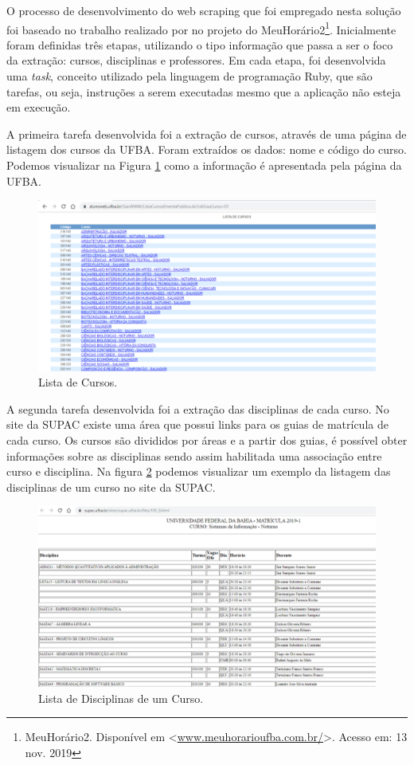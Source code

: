 \documentclass[12pt, a4paper]{report}
\begin{document}
O processo de desenvolvimento do web scraping que foi empregado nesta solução foi baseado no trabalho realizado por \citeauthor{assis2017meuhorario} no projeto do MeuHorário2\footnote{MeuHorário2. Disponível em <\url{www.meuhorarioufba.com.br/}>. Acesso em: 13 nov. 2019}. Inicialmente foram definidas três etapas, utilizando o tipo informação que passa a ser o foco da extração: cursos, disciplinas e professores.  Em cada etapa, foi desenvolvida uma \textit{task}, conceito utilizado pela linguagem de programação Ruby, que são tarefas, ou seja, instruções a serem executadas mesmo que a aplicação não esteja em execução. 

A primeira tarefa desenvolvida foi a extração de cursos, através de uma página de listagem dos cursos da UFBA. Foram extraídos os dados: nome e código do curso. Podemos visualizar na Figura \ref{fig:lista_cursos} como a informação é apresentada pela página da UFBA.

\begin{figure}
\centering
\includegraphics[scale=0.9]{lista_cursos.png}
\caption{Lista de Cursos.}
\label{fig:lista_cursos}
\end{figure}

A segunda tarefa desenvolvida foi a extração das disciplinas de cada curso. No site da \ac{SUPAC} existe uma área que possui links para os guias de matrícula de cada curso. Os cursos são divididos por áreas e a partir dos guias, é possível obter informações sobre as disciplinas sendo assim habilitada uma associação entre curso e disciplina. Na figura \ref{fig:disciplinas} podemos visualizar um exemplo da listagem das disciplinas de um curso no site da SUPAC.

\begin{figure}[ht!]
\centering
\includegraphics[scale=0.8]{disciplinas.png}
\caption{Lista de Disciplinas de um Curso.}
\label{fig:disciplinas}
\end{figure}
\end{document}
